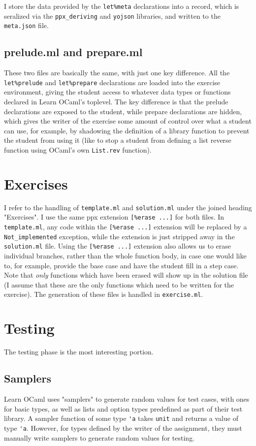 \documentclass[11pt]{article}
\begin{document}
I store the data provided by the \verb+let%meta+ declarations into a record, which is seralized via the \verb+ppx_deriving+ and \verb+yojson+ libraries, and written to the \verb+meta.json+ file.

\subsection{prelude.ml and prepare.ml}
These two files are basically the same, with just one key difference. All the \verb+let%prelude+ and \verb+let%prepare+ declarations are loaded into the exercise environment, giving the student access to whatever data types or functions declared in Learn OCaml's toplevel. The key difference is that the prelude declarations are exposed to the student, while prepare declarations are hidden, which gives the writer of the exercise some amount of control over what a student can use, for example, by shadowing the definition of a library function to prevent the student from using it (like to stop a student from defining a list reverse function using OCaml's own \verb+List.rev+ function).

\section{Exercises}
I refer to the handling of \verb+template.ml+ and \verb+solution.ml+ under the joined heading "Exercises". I use the same ppx extension \verb+[%erase ...]+ for both files. In \verb+template.ml+, any code within the \verb+[%erase ...]+ extension will be replaced by a \verb+Not_implemented+ exception, while the extension is just stripped away in the \verb+solution.ml+ file. Using the \verb+[%erase ...]+ extension also allows us to erase individual branches, rather than the whole function body, in case one would like to, for example, provide the base case and have the student fill in a step case. Note that \textit{only} functions which have been erased will show up in the solution file (I assume that these are the only functions which need to be written for the exercise). The generation of these files is handled in \verb+exercise.ml+.

\section{Testing}
The testing phase is the most interesting portion.

\subsection{Samplers}
Learn OCaml uses "samplers" to generate random values for test cases, with ones for basic types, as well as lists and option types predefined as part of their test library. A sampler function of some type \verb+'a+ takes \verb+unit+ and returns a value of type \verb+'a+. However, for types defined by the writer of the assignment, they must manually write samplers to generate random values for testing.
\end{document}
